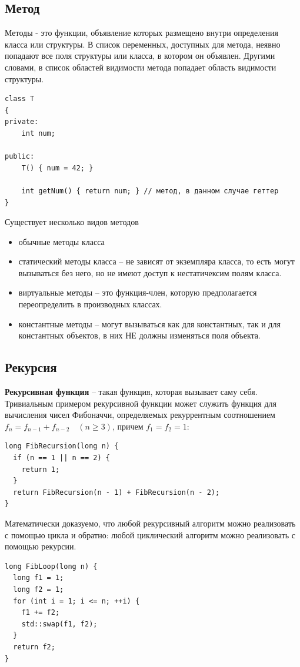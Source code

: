 \subsection{Метод}

Методы - это функции, объявление которых размещено внутри определения класса или структуры. В список переменных, доступных для метода, неявно попадают все поля структуры или класса, в котором он объявлен. Другими словами, в список областей видимости метода попадает область видимости структуры.

\begin{verbatim}
class T
{
private:
    int num;

public:
    T() { num = 42; }

    int getNum() { return num; } // метод, в данном случае геттер
}
\end{verbatim}

Существует несколько видов методов
\begin{itemize}
    \item обычные методы класса
    \item статический методы класса -- не зависят от экземпляра класса, то есть могут вызываться без него, но не имеют доступ к нестатичексим полям класса. 
    \item виртуальные методы -- это функция-член, которую предполагается переопределить в производных классах. 
    \item константные методы -- могут вызываться как для константных, так и для константных объектов, в них НЕ должны изменяться поля объекта. 
\end{itemize}

\subsection{Рекурсия}

\textbf{Рекурсивная функция} -- такая функция, которая вызывает саму себя.
Тривиальным примером рекурсивной функции может служить функция для вычисления чисел Фибоначчи, определяемых рекуррентным соотношением $f_n = f_{n-1} + f_{n-2} \quad (n \geq 3)$, причем $f_1 = f_2 = 1$:
\begin{verbatim}
long FibRecursion(long n) {
  if (n == 1 || n == 2) {
    return 1;
  }
  return FibRecursion(n - 1) + FibRecursion(n - 2);
}  
\end{verbatim}

Математически доказуемо, что любой рекурсивный алгоритм можно реализовать с помощью цикла и обратно: любой циклический алгоритм можно реализовать с помощью рекурсии.
\begin{verbatim}
long FibLoop(long n) {
  long f1 = 1;
  long f2 = 1;
  for (int i = 1; i <= n; ++i) {
    f1 += f2;
    std::swap(f1, f2);
  }
  return f2;
}
\end{verbatim}

